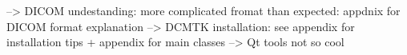 --> DICOM undestanding: more complicated fromat than expected: appdnix for DICOM format explanation
\newline
--> DCMTK installation: see appendix for installation tips + appendix for main classes 
--> Qt tools not so cool
